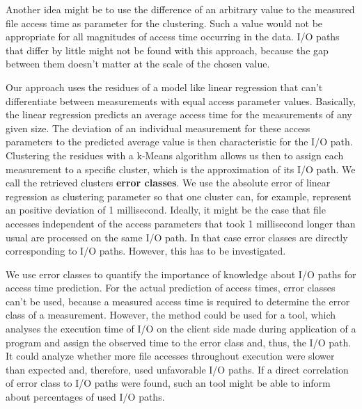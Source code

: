 \documentclass{superfri}
\begin{document}
	Another idea might be to use the difference of an arbitrary value to the measured file access time as parameter for the clustering. 
	Such a value would not be appropriate for all magnitudes of access time occurring in the data.
	I/O paths that differ by little might not be found with this approach, because the gap between them doesn't matter at the scale of the chosen value.
	
	Our approach uses the residues of a model like linear regression that can't differentiate between measurements with equal access parameter values.
	Basically, the linear regression predicts an average access time for the measurements of any given size.
	The deviation of an individual measurement for these access parameters to the predicted average value is then characteristic for the I/O path.
	Clustering the residues with a k-Means algorithm allows us then to assign each measurement to a specific cluster, which is the approximation of its I/O path.
	We call the retrieved clusters \textbf{error classes}.
	We use the absolute error of linear regression as clustering parameter so that one cluster can, for example, represent an positive deviation of 1 millisecond.
	Ideally, it might be the case that file accesses independent of the access parameters that took 1 millisecond longer than usual are processed on the same I/O path.
	In that case error classes are directly corresponding to I/O paths. 
	However, this has to be investigated.
	
	\medskip
	
	We use error classes to quantify the importance of knowledge about I/O paths for access time prediction. 
	For the actual prediction of access times, error classes can't be used, because a measured access time is required to determine the error class of a measurement.
	However, the method could be used for a tool, which analyses the execution time of I/O on the client side made during application of a program and assign the observed time to the error class and, thus, the I/O path. 
	It could analyze whether more file accesses throughout execution were slower than expected and, therefore, used unfavorable I/O paths.
	If a direct correlation of error class to I/O paths were found, such an tool might be able to inform about percentages of used I/O paths.
	
\end{document}
